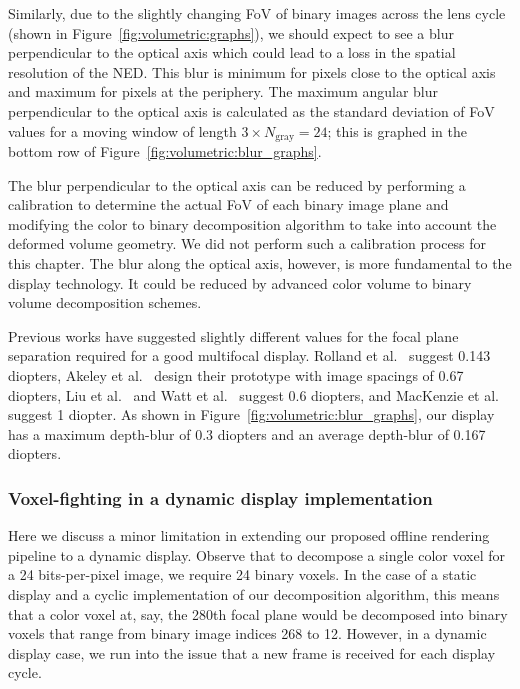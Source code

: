 Similarly, due to the slightly changing FoV of binary images across the lens cycle (shown in Figure~\ref{fig:volumetric:graphs}), we should expect to see a blur perpendicular to the optical axis which could lead to a loss in the spatial resolution of the NED. This blur is minimum for pixels close to the optical axis and maximum for pixels at the periphery. The maximum angular blur perpendicular to the optical axis is calculated as the standard deviation of FoV values for a moving window of length $3 \times N_{\text{gray}}=24$; this is graphed in the bottom row of Figure~\ref{fig:volumetric:blur_graphs}.

The blur perpendicular to the optical axis can be reduced by performing a calibration to determine the actual FoV of each binary image plane and modifying the color to binary decomposition algorithm to take into account the deformed volume geometry. We did not perform such a calibration process for this chapter. The blur along the optical axis, however, is more fundamental to the display technology. It could be reduced by advanced color volume to binary volume decomposition schemes. 

Previous works have suggested slightly different values for the focal plane separation required for a good multifocal display. Rolland et al.~\cite{Rolland1999dynamic} suggest 0.143 diopters, Akeley et al.~\cite{Akeley2004} design their prototype with image spacings of 0.67 diopters, Liu et al.~\cite{Liu2010systematic} and Watt et al.~\cite{Watt2012Real} suggest 0.6 diopters, and MacKenzie et al.~\cite{MacKenzie2010Accommodation} suggest 1 diopter. As shown in Figure~\ref{fig:volumetric:blur_graphs}, our display has a maximum depth-blur of 0.3 diopters and an average depth-blur of 0.167 diopters. 



\subsubsection{Voxel-fighting in a dynamic display implementation}
Here we discuss a minor limitation in extending our proposed offline rendering pipeline to a dynamic display. Observe that to decompose a single color voxel for a 24 bits-per-pixel image, we require 24 binary voxels. In the case of a static display and a cyclic implementation of our decomposition algorithm, this means that a color voxel at, say, the 280th focal plane would be decomposed into binary voxels that range from binary image indices 268 to 12. However, in a dynamic display case, we run into the issue that a new frame is received for each display cycle. 

